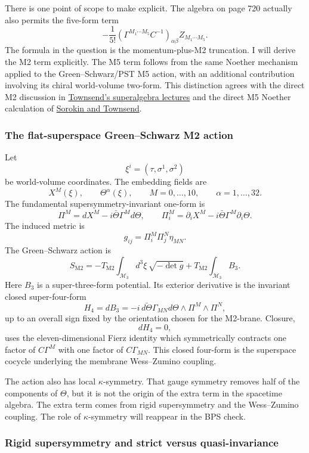 \documentclass[
  10pt,
  a4paper,
  openany]{book}
\begin{document}
There is one point of scope to make explicit. The algebra on page 720
actually also permits the five-form term \[
-\frac1{5!}
(\Gamma^{M_1\cdots M_5}C^{-1})_{\alpha\beta}
Z_{M_1\cdots M_5}.
\] The formula in the question is the momentum-plus-M2 truncation. I
will derive the M2 term explicitly. The M5 term follows from the same
Noether mechanism applied to the Green--Schwarz/PST M5 action, with an
additional contribution involving its chiral world-volume two-form. This
distinction agrees with the direct M2 discussion in
\href{https://arxiv.org/abs/hep-th/9712004}{Townsend's superalgebra
lectures} and the direct M5 Noether calculation of
\href{https://arxiv.org/abs/hep-th/9708003}{Sorokin and Townsend}.

\subsubsection{The flat-superspace Green--Schwarz M2
action}\label{the-flat-superspace-greenschwarz-m2-action}

Let \[
\xi^i=(\tau,\sigma^1,\sigma^2)
\] be world-volume coordinates. The embedding fields are \[
X^M(\xi),
\qquad
\Theta^\alpha(\xi),
\qquad
M=0,\ldots,10,
\qquad
\alpha=1,\ldots,32.
\] The fundamental supersymmetry-invariant one-form is \[
\boxed{
\Pi^M=dX^M-i\bar\Theta\Gamma^M d\Theta
},
\qquad
\Pi_i^M=\partial_iX^M-i\bar\Theta\Gamma^M\partial_i\Theta.
\] The induced metric is \[
g_{ij}=\Pi_i^M\Pi_j^N\eta_{MN}.
\] The Green--Schwarz action is \[
\boxed{
S_{\mathrm{M2}}
=-T_{\mathrm{M2}}
\int_{\mathcal M_3}d^3\xi\,\sqrt{-\det g}
+T_{\mathrm{M2}}
\int_{\mathcal M_3}B_3
}.
\] Here \(B_3\) is a super-three-form potential. Its exterior derivative
is the invariant closed super-four-form \[
H_4=dB_3
=-i\,\bar{d\Theta}\Gamma_{MN}d\Theta
\wedge\Pi^M\wedge\Pi^N,
\] up to an overall sign fixed by the orientation chosen for the
M2-brane. Closure, \[
dH_4=0,
\] uses the eleven-dimensional Fierz identity which symmetrically
contracts one factor of \(C\Gamma^M\) with one factor of
\(C\Gamma_{MN}\). This closed four-form is the superspace cocycle
underlying the membrane Wess--Zumino coupling.

The action also has local \(\kappa\)-symmetry. That gauge symmetry
removes half of the components of \(\Theta\), but it is not the origin
of the extra term in the spacetime algebra. The extra term comes from
rigid supersymmetry and the Wess--Zumino coupling. The role of
\(\kappa\)-symmetry will reappear in the BPS check.

\subsubsection{Rigid supersymmetry and strict versus
quasi-invariance}\label{rigid-supersymmetry-and-strict-versus-quasi-invariance}
\end{document}
